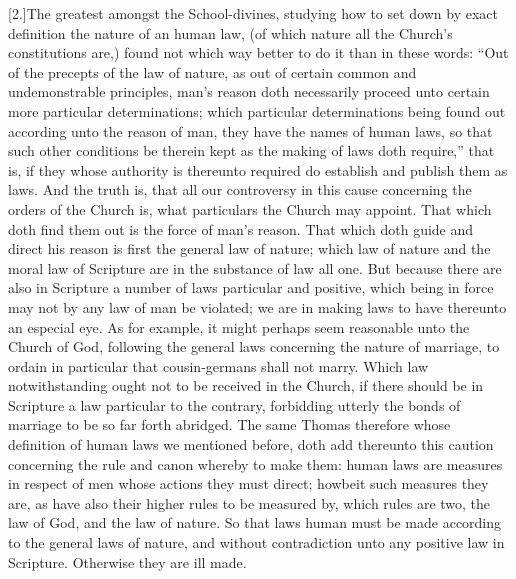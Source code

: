 [2.]The greatest amongst the School-divines, studying how to set down by exact definition the nature of an human law, (of which nature all the Church’s constitutions are,) found not which way better to do it than in these words: “Out of the precepts of the law of nature, as out of certain common and undemonstrable principles, man’s reason doth necessarily proceed unto certain more particular determinations; which particular determinations being found out according unto the reason of man, they have the names of human laws, so that such other conditions be therein kept as the making of laws doth require,” that is, if they whose authority is thereunto required do establish and publish them as laws. And  the truth is, that all our controversy in this cause concerning the orders of the Church is, what particulars the Church may appoint. That which doth find them out is the force of man’s reason. That which doth guide and direct his reason is first the general law of nature; which law of nature and the moral law of Scripture are in the substance of law all one. But because there are also in Scripture a number of laws particular and positive, which being in force may not by any law of man be violated; we are in making laws to have thereunto an especial eye. As for example, it might perhaps seem reasonable unto the Church of God, following the general laws concerning the nature of marriage, to ordain in particular that cousin-germans shall not marry. Which law notwithstanding ought not to be received in the Church, if there should be in Scripture a law particular to the contrary, forbidding utterly the bonds of marriage to be so far forth abridged. The same Thomas therefore whose definition of human laws we mentioned before, doth add thereunto this caution concerning the rule and canon whereby to make them: human laws are measures in respect of men whose actions they must direct; howbeit such measures they are, as have also their higher rules to be measured by, which rules are two, the law of God, and the law of nature. So that laws human must be made according to the general laws of nature, and without contradiction unto any positive law in Scripture. Otherwise they are ill made.

